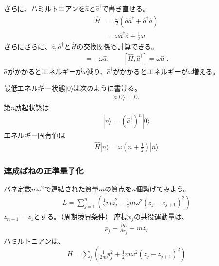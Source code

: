 \documentclass[10pt,a4paper]{jarticle}
\begin{document}
さらに、ハミルトニアンを$\hat a$と$\hat a^\dagger$で書き直せる。
\begin{align}
\hat H
&= \frac{\omega}{2}(\hat a \hat a^\dagger + \hat a^\dagger \hat a) \nonumber\\
&= \omega \hat a^\dagger \hat a + \frac{1}{2}\omega
\end{align}
%
さらにさらに、$\hat a, \hat a^\dagger$と$\hat H$の交換関係も計算できる。
\begin{align}
[\hat H, \hat a] = -\omega \hat a, \qquad
[\hat H, \hat a^\dagger] = \omega \hat a^\dagger.
\end{align}
$\hat a$がかかるとエネルギーが$\omega$減り、$\hat a^\dagger$がかかるとエネルギーが$\omega$増える。

最低エネルギー状態$|0\rangle$は次のように書ける。
\begin{align}
\hat a|0\rangle = 0.
\end{align}
第$n$励起状態は
\begin{align}
|n\rangle = (\hat a^\dagger)^n |0\rangle
\end{align}
%
エネルギー固有値は
\begin{align}
\hat H|n\rangle = \omega\left(n + \frac{1}{2}\right) |n\rangle
\end{align}


\subsubsection{連成ばねの正準量子化}
バネ定数$m\omega^2$で連結された質量$m$の質点を$n$個繋げてみよう。
\begin{align}
L = \sum_{j=1}^n \left( \frac{1}{2} m \dot z_j^2 - \frac{1}{2} m\omega^2 (z_j - z_{j+1})^2 \right)
\end{align}
$z_{n+1} = z_1$とする。（周期境界条件）
%
座標$x_j$の共役運動量は、
\begin{align}
p_j = \frac{\partial L}{\partial x_j} = m z_j
\end{align}
%
ハミルトニアンは、
\begin{align}
H = \sum_j \left( \frac{1}{2m} p_j^2 + \frac{1}{2} m\omega^2 (z_j - z_{j+1})^2 \right)
\end{align}
\end{document}
